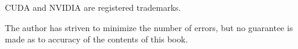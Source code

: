 CUDA and NVIDIA are registered trademarks.


The author has striven to minimize the number of errors, but no
guarantee is made as to accuracy of the contents of this book.


\newpage

% 
% 
% 
% 

